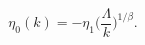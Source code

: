 \begin{equation}
\eta_{0}(k) = - \eta_{1} \biggl(\frac{\Lambda}{k}\biggr)^{1/\beta}.
\end{equation}

